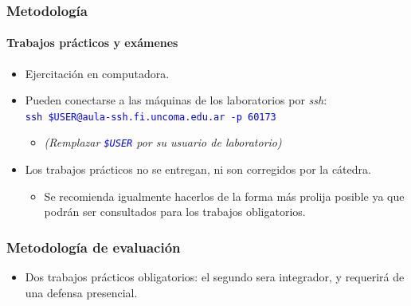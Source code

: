 \documentclass[11pt,a4paper,spanish]{beamer}
\newcommand{\codeword}[1]{\mbox{\texttt{\textcolor{blue}{#1}}}}
\begin{document}
\begin{frame}

    \frametitle{Metodología}
    \framesubtitle{Trabajos prácticos y exámenes}

\begin{itemize}

    \item Ejercitación en computadora.
    \item Pueden conectarse a las máquinas de los laboratorios por
        \emph{ssh}:\\
        \codeword{ssh \$USER@aula-ssh.fi.uncoma.edu.ar -p 60173}
        \begin{itemize}
            \item[] \tiny{\emph{(Remplazar \codeword{\$USER} por su usuario de
                laboratorio)}}
        \end{itemize}
    \item Los trabajos prácticos no se entregan, ni son corregidos por la
        cátedra.
        \begin{itemize}
            \item Se recomienda igualmente hacerlos de la forma más prolija
                posible ya que podrán ser consultados para los trabajos
                obligatorios.
        \end{itemize}

\end{itemize}

\end{frame}

\begin{frame}

    \frametitle{Metodología de evaluación}

\begin{itemize}

    \item Dos trabajos prácticos obligatorios: el segundo sera integrador, y
        requerirá de una defensa presencial.
\end{itemize}

\end{frame}
\end{document}
